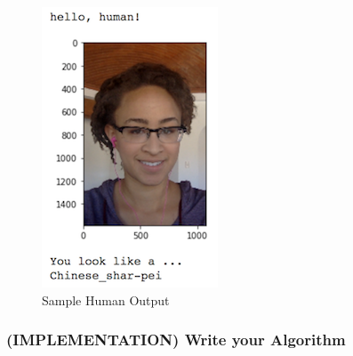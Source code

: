 \documentclass[11pt]{article}
\makeatletter
\def\maxwidth{\ifdim\Gin@nat@width>\linewidth\linewidth
    \else\Gin@nat@width\fi}
\let\Oldincludegraphics\includegraphics
\renewcommand{\includegraphics}[1]{\Oldincludegraphics[width=.8\maxwidth]{#1}}
\makeatother
\begin{document}
\begin{figure}
\centering
\includegraphics{images/sample_human_output.png}
\caption{Sample Human Output}
\end{figure}

\subsubsection{(IMPLEMENTATION) Write your
Algorithm}\label{implementation-write-your-algorithm}
\end{document}
